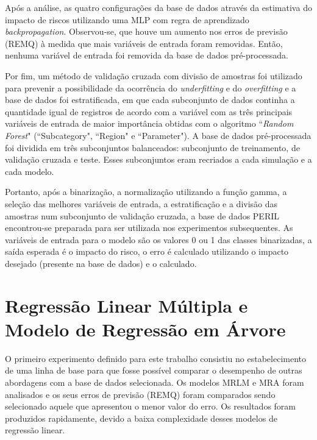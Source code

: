 Após a análise, as quatro configurações da base de dados através da estimativa do impacto de riscos utilizando uma MLP com regra de aprendizado \textit{backpropagation}. Observou-se, que houve um aumento nos erros de previsão (REMQ) à medida que mais variáveis de entrada foram removidas. Então, nenhuma variável de entrada foi removida da base de dados pré-processada.

Por fim, um método de validação cruzada com divisão de amostras foi utilizado para prevenir a possibilidade da ocorrência do \textit{underfitting} e do \textit{overfitting} e a base de dados foi estratificada, em que cada subconjunto de dados continha a quantidade igual de registros de acordo com a variável com as três principais variáveis de entrada de maior importância obtidas com o algoritmo ``\textit{Random Forest}" (``Subcategory", ``Region" e ``Parameter"). A base de dados pré-processada foi dividida em três subconjuntos balanceados: subconjunto de treinamento, de validação cruzada e teste. Esses subconjuntos eram recriados a cada simulação e a cada modelo.

Portanto, após a binarização, a normalização utilizando a função gamma, a seleção das melhores variáveis de entrada, a estratificação e a divisão das amostras num subconjunto de validação cruzada, a base de dados PERIL encontrou-se preparada para ser utilizada nos experimentos subsequentes. As variáveis de entrada para o modelo são os valores 0 ou 1 das classes binarizadas, a saída esperada é o impacto do risco, o erro é calculado utilizando o impacto desejado (presente na base de dados) e o calculado.

\section{Regressão Linear Múltipla e Modelo de Regressão em Árvore}

O primeiro experimento definido para este trabalho consistiu no estabelecimento de uma linha de base para que fosse possível comparar o desempenho de outras abordagens com a base de dados selecionada. Os modelos MRLM e MRA foram analisados e os seus erros de previsão (REMQ) foram comparados sendo selecionado aquele que apresentou o menor valor do erro. Os resultados foram produzidos rapidamente, devido a baixa complexidade desses modelos de regressão linear.

